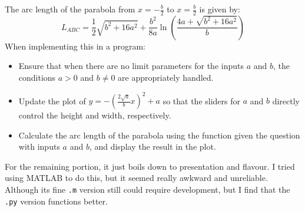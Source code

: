 \documentclass[a4paper, 12pt]{report}
\begin{document}
    The arc length of the parabola from $x = -\frac{b}{2}$ to $x = \frac{b}{2}$ is given by:
    \[L_{ABC} = \frac{1}{2}\sqrt{b^2 + 16a^2} + \frac{b^2}{8a}\ln\left(\frac{4a + \sqrt{b^2 + 16a^2}}{b}\right)\]
    When implementing this in a program:
    \begin{itemize}[itemsep=-0.1cm]
        \item Ensure that when there are no limit parameters for the inputs \(a\) and \(b\), the conditions \(a > 0\) and \(b \neq 0\) are appropriately handled.
        \item Update the plot of \(y = -\left(\frac{2\sqrt{a}}{b}x\right)^2 + a\) so that the sliders for \(a\) and \(b\) directly control the height and width, respectively.
        \item Calculate the arc length of the parabola using the function given the question with inputs \(a\) and \(b\), and display the result in the plot.
    \end{itemize}
    \raggedright
    
    For the remaining portion, it just boils down to presentation and flavour. I tried using MATLAB to do this, but it seemed really awkward and unreliable. Although its fine \texttt{.m} version still could require development, but I find that the \texttt{.py} version functions better.

    \newpage
    
    \centering
    
\end{document}
